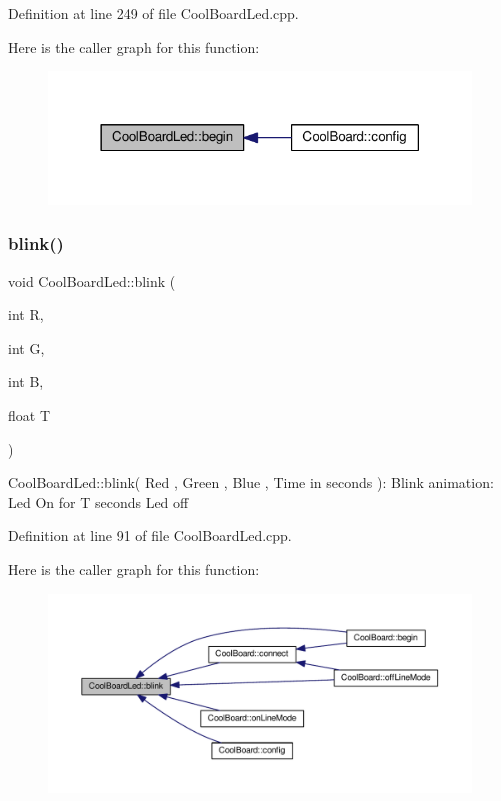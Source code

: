 Definition at line 249 of file Cool\+Board\+Led.\+cpp.

Here is the caller graph for this function\+:\nopagebreak
\begin{figure}[H]
\begin{center}
\leavevmode
\includegraphics[width=318pt]{class_cool_board_led_ae3cbde8affcc6f011cbd698c8ef911f6_icgraph}
\end{center}
\end{figure}
\mbox{\label{class_cool_board_led_a96e1ea13003eee34c9dbcef340404426}} 
\subsubsection{\texorpdfstring{blink()}{blink()}}
{\footnotesize\ttfamily void Cool\+Board\+Led\+::blink (\begin{DoxyParamCaption}\item[{int}]{R,  }\item[{int}]{G,  }\item[{int}]{B,  }\item[{float}]{T }\end{DoxyParamCaption})}

Cool\+Board\+Led\+::blink( Red , Green , Blue , Time in seconds )\+: Blink animation\+: Led On for T seconds Led off 

Definition at line 91 of file Cool\+Board\+Led.\+cpp.

Here is the caller graph for this function\+:\nopagebreak
\begin{figure}[H]
\begin{center}
\leavevmode
\includegraphics[width=350pt]{class_cool_board_led_a96e1ea13003eee34c9dbcef340404426_icgraph}
\end{center}
\end{figure}
\mbox{\label{class_cool_board_led_a1b60e5e30bea96c49ed62ed1bf1ffc8b}} 
